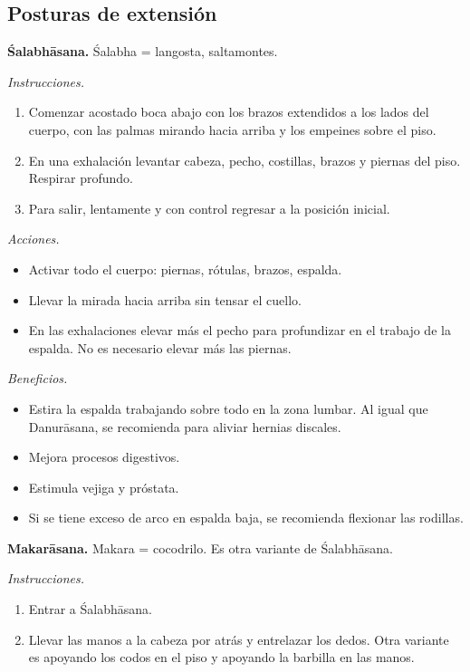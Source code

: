 \subsection{Posturas de extensión}
\label{section-posturas-de-extension}

\medskip\noindent\textbf{Śalabhāsana.}
Śalabha = langosta, saltamontes.

\emph{Instrucciones.}
\begin{enumerate}
\item Comenzar acostado boca abajo con los
brazos extendidos a los lados del cuerpo, con
las palmas mirando hacia arriba y los
empeines sobre el piso.
\item En una exhalación levantar cabeza,
pecho, costillas, brazos y piernas del piso.
Respirar profundo.
\item Para salir, lentamente y con control
regresar a la posición inicial.
\end{enumerate}

\emph{Acciones.}
\begin{itemize}
\item Activar todo el cuerpo: piernas,
rótulas, brazos, espalda.
\item Llevar la mirada hacia arriba sin
tensar el cuello.
\item En las exhalaciones elevar más el pecho
para profundizar en el trabajo de la espalda.
No es necesario elevar más las piernas.
\end{itemize}

\emph{Beneficios.}
\begin{itemize}
\item Estira la espalda trabajando sobre todo
en la zona lumbar. Al igual que Danurāsana,
se recomienda para aliviar hernias discales.
\item Mejora procesos digestivos.
\item Estimula vejiga y próstata.
\item Si se tiene exceso de arco en espalda
baja, se recomienda flexionar las rodillas.
\end{itemize}

\medskip\noindent\textbf{Makarāsana.}
Makara = cocodrilo. Es otra variante de
Śalabhāsana.

\emph{Instrucciones.}
\begin{enumerate}
\item Entrar a Śalabhāsana.
\item Llevar las manos a la cabeza por atrás
y entrelazar los dedos. Otra variante es
apoyando los codos en el piso y apoyando la
barbilla en las manos.
\end{enumerate}

